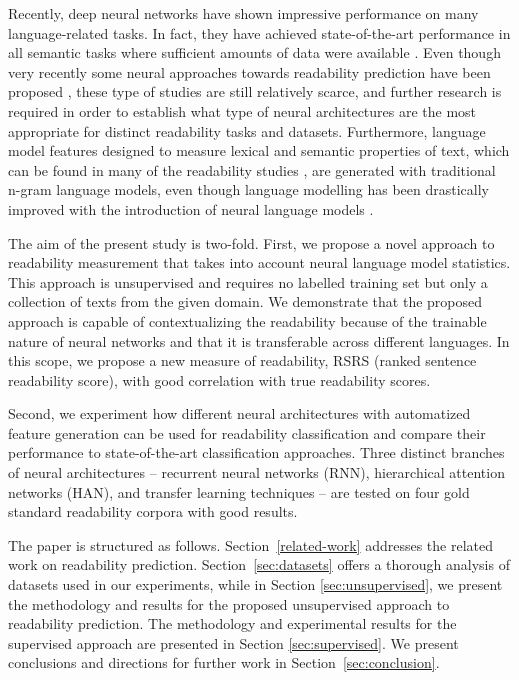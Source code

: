 \documentclass{clv3}
\begin{document}
Recently, deep neural networks \citep{Goodfellow2016} have shown impressive performance on many language-related tasks. In fact, they have achieved state-of-the-art performance in all semantic tasks where sufficient amounts of data were available \citep{Collobert2011,Zhang2015}. Even though very recently some neural approaches towards readability prediction have been proposed \citep{filighera2019automatic, nadeem2018estimating}, these type of studies are still relatively scarce, and further research is required in order to establish what type of neural architectures are the most appropriate for distinct readability tasks and datasets. Furthermore, language model features designed to measure lexical and semantic properties of text, which can be found in many of the readability studies \citep{schwarm2005reading, petersen2009machine, xia2016text}, are generated with traditional n-gram language models, even though language modelling has been drastically improved with the introduction of neural language models \citep{mikolov2011empirical}. 

The aim of the present study is two-fold. First, we propose a novel approach to readability measurement that takes into account neural language model statistics. This approach is unsupervised and requires no labelled training set but only a collection of texts from the given domain. We demonstrate that the proposed approach is capable of contextualizing the readability because of the trainable nature of neural networks and that it is transferable across different languages. In this scope, we propose a new measure of readability, RSRS (ranked sentence readability score), with good correlation with true readability scores.

Second, we experiment how different neural architectures with automatized feature generation can be used for readability classification and compare their performance to state-of-the-art classification approaches. Three distinct branches of neural architectures -- recurrent neural networks (RNN), hierarchical attention networks (HAN), and transfer learning techniques -- are tested on four gold standard readability corpora with good results. 

The paper is structured as follows. Section~\ref{related-work} addresses the related work on readability prediction. Section~\ref{sec:datasets} offers a thorough analysis of datasets used in our experiments, while in Section \ref{sec:unsupervised}, we present the methodology and results for the proposed unsupervised approach to readability prediction. The methodology and experimental results for the supervised approach are presented in Section \ref{sec:supervised}. We present conclusions and directions for further work in Section~\ref{sec:conclusion}.
\end{document}
